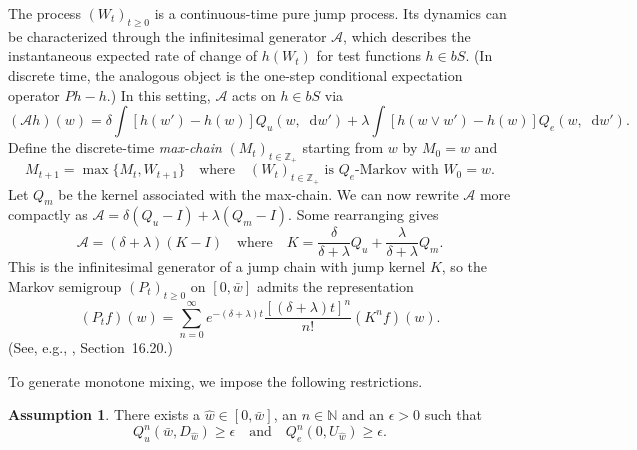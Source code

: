 \documentclass[12pt,reqno]{amsart}
\numberwithin{equation}{section}
\theoremstyle{definition}
\newtheorem{assumption}{Assumption}[section]
\newcommand{\1}{\mathbbm{1}}
\newcommand{\NN}{\mathbb{N}}
\newcommand{\ZZ}{\mathbb{Z}}
\newcommand{\diff}{\mathop{}\!\mathrm{d}}
\newcommand{\navy}[1]{\textit{\textcolor{blue!40!black}{#1}}}
\begin{document}
The process $(W_t)_{t \geq 0}$ is a continuous-time pure jump process. Its
dynamics can be characterized through the infinitesimal generator
$\mathcal{A}$, which describes the instantaneous expected rate of change of
$h(W_t)$ for test functions $h \in bS$. (In discrete time, the analogous
object is the one-step conditional expectation operator $Ph - h$.) In this
setting, $\mathcal{A}$ acts on $h \in bS$ via
%
\begin{equation*}
    (\mathcal{A}h)(w)
    = \delta \int
        \left[ h(w') - h(w) \right] Q_u(w, \diff w')
        + \lambda \int \left[ h(w \vee w') - h(w) \right] Q_e(w, \diff w').
\end{equation*}
%
Define the discrete-time \navy{max-chain} $(M_t)_{t \in \ZZ_+}$ starting from $w$ by
$M_0 = w$ and
%
\begin{equation*}
    M_{t+1} = \max\{M_t, W_{t+1}\}
    \quad \text{where} \quad
    (W_t)_{t \in \ZZ_+} \text{ is $Q_e$-Markov with $W_0 = w$}.
\end{equation*}
%
Let $Q_{m}$ be the kernel associated with the max-chain.
We can now rewrite $\mathcal{A}$ more compactly as 
$\mathcal{A} = \delta (Q_u - I) + \lambda (Q_{m} - I)$.
Some rearranging gives
%
\begin{equation*}
    \mathcal{A} = (\delta + \lambda)(K - I)
    \quad \text{where} \quad
    K = \frac{\delta}{\delta + \lambda} Q_u + \frac{\lambda}{\delta + \lambda}
    Q_{m}.
\end{equation*}
%
This is the infinitesimal generator of a jump chain with jump kernel $K$, so the 
Markov semigroup $(P_t)_{t \geq 0}$ on $[0, \bar w]$ admits the representation
%
\begin{equation}\label{eq:ptfjk}
    (P_t f)(w) 
    = \sum_{n=0}^{\infty} e^{-(\delta + \lambda)t} 
    \frac{[(\delta + \lambda)t]^n}{n!} (K^n f)(w).
\end{equation}
%
(See, e.g., \cite{siegrist2022}, Section~16.20.)  

To generate monotone mixing, we impose the following restrictions. 

\begin{assumption}\label{a:quqe}
    There exists a $\hat{w} \in [0, \bar{w}]$, an $n \in \NN$ and an $\epsilon >
    0$ such that
    \begin{equation}
        Q_u^n(\bar{w}, D_{\hat{w}}) \geq \epsilon
        \quad \text{and} \quad
        Q_e^n(0, U_{\hat{w}}) \geq \epsilon.
    \end{equation}
\end{assumption}
\end{document}

